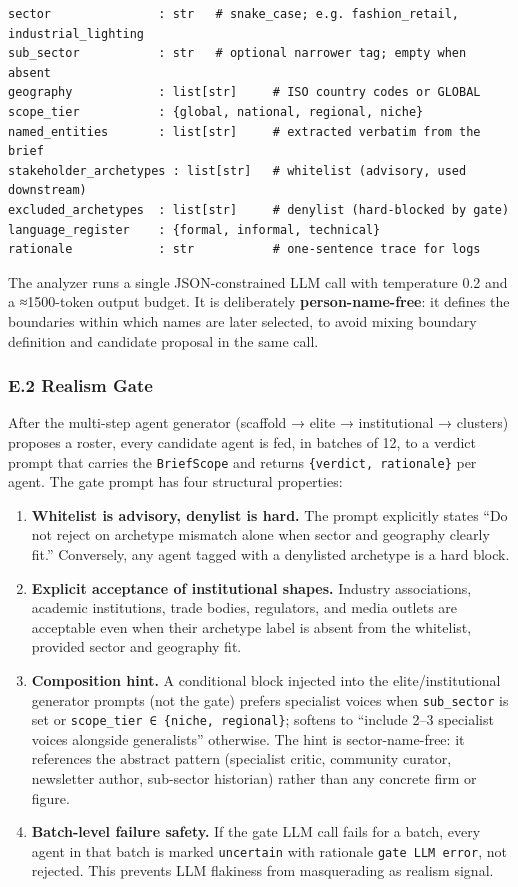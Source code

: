 \documentclass[
]{article}
\providecommand{\tightlist}{%
  \setlength{\itemsep}{0pt}\setlength{\parskip}{0pt}}
\begin{document}
\begin{verbatim}
sector               : str   # snake_case; e.g. fashion_retail, industrial_lighting
sub_sector           : str   # optional narrower tag; empty when absent
geography            : list[str]     # ISO country codes or GLOBAL
scope_tier           : {global, national, regional, niche}
named_entities       : list[str]     # extracted verbatim from the brief
stakeholder_archetypes : list[str]   # whitelist (advisory, used downstream)
excluded_archetypes  : list[str]     # denylist (hard-blocked by gate)
language_register    : {formal, informal, technical}
rationale            : str           # one-sentence trace for logs
\end{verbatim}

The analyzer runs a single JSON-constrained LLM call with temperature
0.2 and a ≈1500-token output budget. It is deliberately
\textbf{person-name-free}: it defines the boundaries within which names
are later selected, to avoid mixing boundary definition and candidate
proposal in the same call.

\subsubsection{E.2 Realism Gate}\label{e.2-realism-gate}

After the multi-step agent generator (scaffold → elite → institutional →
clusters) proposes a roster, every candidate agent is fed, in batches of
12, to a verdict prompt that carries the \texttt{BriefScope} and returns
\texttt{\{verdict,\ rationale\}} per agent. The gate prompt has four
structural properties:

\begin{enumerate}
\def\labelenumi{\arabic{enumi}.}
\tightlist
\item
  \textbf{Whitelist is advisory, denylist is hard.} The prompt
  explicitly states ``Do not reject on archetype mismatch alone when
  sector and geography clearly fit.'' Conversely, any agent tagged with
  a denylisted archetype is a hard block.
\item
  \textbf{Explicit acceptance of institutional shapes.} Industry
  associations, academic institutions, trade bodies, regulators, and
  media outlets are acceptable even when their archetype label is absent
  from the whitelist, provided sector and geography fit.
\item
  \textbf{Composition hint.} A conditional block injected into the
  elite/institutional generator prompts (not the gate) prefers
  specialist voices when \texttt{sub\_sector} is set or
  \texttt{scope\_tier\ ∈\ \{niche,\ regional\}}; softens to ``include
  2--3 specialist voices alongside generalists'' otherwise. The hint is
  sector-name-free: it references the abstract pattern (specialist
  critic, community curator, newsletter author, sub-sector historian)
  rather than any concrete firm or figure.
\item
  \textbf{Batch-level failure safety.} If the gate LLM call fails for a
  batch, every agent in that batch is marked \texttt{uncertain} with
  rationale \texttt{gate\ LLM\ error}, not rejected. This prevents LLM
  flakiness from masquerading as realism signal.
\end{enumerate}
\end{document}
